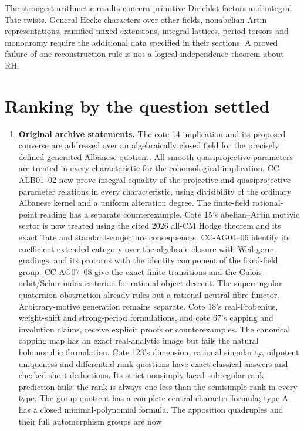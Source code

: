 \documentclass[11pt,a4paper]{article}
\theoremstyle{definition}\newtheorem{definition}[theorem]{Definition}
\theoremstyle{remark}\newtheorem{remark}[theorem]{Remark}
\begin{document}
The strongest arithmetic results concern primitive Dirichlet factors
and integral Tate twists. General Hecke characters over other fields,
nonabelian Artin representations, ramified mixed extensions, integral
lattices, period torsors and monodromy require the additional data
specified in their sections. A proved failure of one reconstruction
rule is not a logical-independence theorem about RH.

\section*{Ranking by the question settled}
\begin{enumerate}
\item \textbf{Original archive statements.} The cote 14 implication and
its proposed converse are addressed over an algebraically closed field
for the precisely defined generated Albanese quotient. All smooth
quasiprojective parameters are treated in every characteristic for the
cohomological implication. CC-ALB01--02 now prove integral equality
of the projective and quasiprojective parameter relations in every
characteristic, using divisibility of the ordinary Albanese kernel
and a uniform alteration degree. The finite-field rational-point reading
has a separate counterexample. Cote 15's abelian--Artin motivic sector is
now treated using the cited 2026 all-CM Hodge theorem and its exact Tate
and standard-conjecture consequences. CC-AG04--06 identify its
coefficient-extended category over the algebraic closure with Weil-germ
gradings, and its protorus with the identity component of the fixed-field
group. CC-AG07--08 give the exact finite transitions and the
Galois-orbit/Schur-index criterion for rational object descent. The
supersingular quaternion obstruction already rules out a rational
neutral fibre functor. Arbitrary-motive generation remains separate. Cote 18's real-Frobenius,
weight-shift and strong-period formulations, and cote 67's capping and
involution claims, receive explicit proofs or counterexamples.
The canonical capping map has an exact real-analytic image but fails
the natural holomorphic formulation. Cote 123's dimension, rational
singularity, nilpotent uniqueness and differential-rank questions have
exact classical answers and checked short deductions. Its strict
nonsimply-laced subregular rank prediction fails: the rank is always
one less than the semisimple rank in every type. The group quotient has a complete
central-character formula; type A has a closed minimal-polynomial
formula. The apposition quadruples and their full automorphism groups are now

\end{enumerate}
\end{document}
